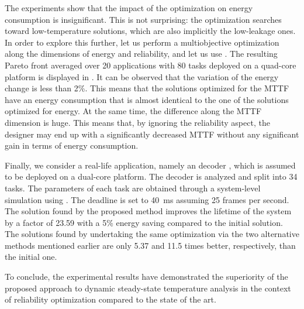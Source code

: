 The experiments show that the impact of the optimization on energy consumption
is insignificant. This is not surprising: the optimization searches toward
low-temperature solutions, which are also implicitly the low-leakage ones. In
order to explore this further, let us perform a multiobjective optimization
along the dimensions of energy and reliability, and let us use 
\cite{deb2002}. The resulting Pareto front averaged over 20 applications with 80
tasks deployed on a quad-core platform is displayed in
. It can be observed that the variation
of the energy change is less than 2\%. This means that the solutions optimized
for the \ac{MTTF} have an energy consumption that is almost identical to the one
of the solutions optimized for energy. At the same time, the difference along
the \ac{MTTF} dimension is huge. This means that, by ignoring the reliability
aspect, the designer may end up with a significantly decreased \ac{MTTF} without
any significant gain in terms of energy consumption.

Finally, we consider a real-life application, namely an  decoder
\cite{ffmpeg}, which is assumed to be deployed on a dual-core platform. The
decoder is analyzed and split into 34 tasks. The parameters of each task are
obtained through a system-level simulation using  \cite{benini2005}.
The deadline is set to 40~ms assuming 25 frames per second. The solution found
by the proposed method improves the lifetime of the system by a factor of 23.59
with a 5\% energy saving compared to the initial solution. The solutions found
by undertaking the same optimization via the two alternative methods mentioned
earlier are only 5.37 and 11.5 times better, respectively, than the initial one.

To conclude, the experimental results have demonstrated the superiority of the
proposed approach to dynamic steady-state temperature analysis in the context of
reliability optimization compared to the state of the art.

